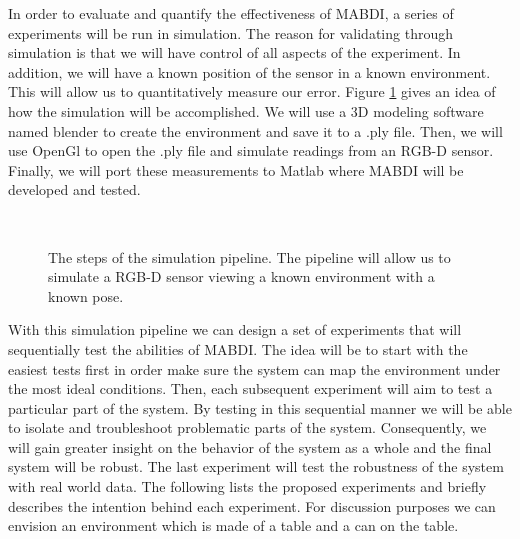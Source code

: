 \documentclass[12pt]{article}
\begin{document}
In order to evaluate and quantify the effectiveness of MABDI, a series of
experiments will be run in simulation.  The reason for validating through
simulation is that we will have control of all aspects of the experiment.
In addition, we will have a known position of the sensor in a known
environment. This will allow us to quantitatively measure our error. Figure
\ref{fig:Sim} gives an idea of how the simulation will be accomplished. We
will use a 3D modeling software named blender to create the environment and
save it to a .ply file. Then, we will use OpenGl to open the .ply file and
simulate readings from an RGB-D sensor. Finally, we will port these
measurements to Matlab where MABDI will be
developed and tested. 

\begin{figure}[h]
\centering
{} \quad
{} \quad
{} \\
\caption{The steps of the simulation pipeline. The pipeline will allow
us to simulate a RGB-D sensor viewing a known environment with a known
pose.}
\label{fig:Sim}
\end{figure}

With this simulation pipeline we can design a set of experiments that will
sequentially test the abilities of MABDI. The idea
will be to start with the easiest tests first in order make sure the system
can map the environment under the most ideal conditions. Then, each
subsequent experiment will aim to test a particular part of the system. By
testing in this sequential manner we will be able to isolate and
troubleshoot problematic parts of the system. Consequently, we will gain
greater insight on the behavior of the system as a whole and the final
system will be robust. The last experiment will test the robustness of the
system with real world data. The following lists the proposed experiments
and briefly describes the intention behind each experiment. For discussion
purposes we can envision an environment which is made of a table and a can
on the table. 
\end{document}
